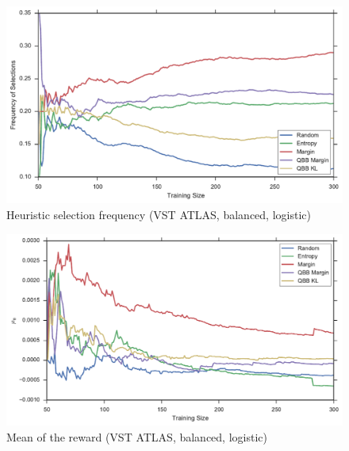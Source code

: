 \begin{figure}[p]
	\centering
	\includegraphics[width=\textwidth]{figures/5_thompson/vstatlas_bl_frequencies}
	\caption[Heuristic selection frequency (VST ATLAS, balanced, logistic)]{
		Heuristic selection frequency (VST ATLAS, balanced, logistic)}
	\label{fig:vstatlas_bl_frequencies}
\end{figure}

\begin{figure}[p]
	\centering
	\includegraphics[width=\textwidth]{figures/5_thompson/vstatlas_bl_mus}
	\caption[Mean of the reward (VST ATLAS, balanced, logistic)]{
		Mean of the reward (VST ATLAS, balanced, logistic)}
	\label{fig:vstatlas_bl_mus}
\end{figure}


